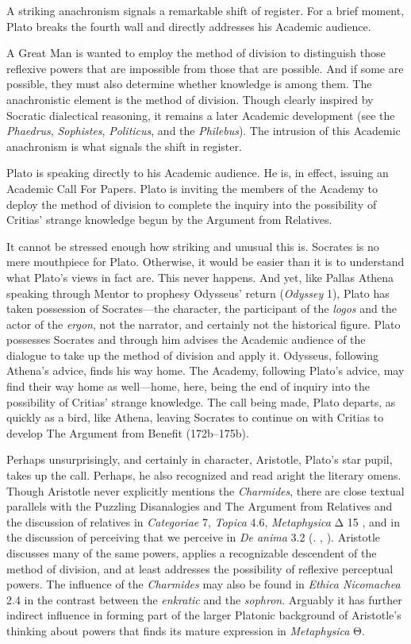 A striking anachronism signals a remarkable shift of register. For a brief moment, Plato breaks the fourth wall and directly addresses his Academic audience.

A Great Man is wanted to employ the method of division to distinguish those reflexive powers that are impossible from those that are possible. And if some are possible, they must also determine whether knowledge is among them. The anachronistic element is the method of division. Though clearly inspired by Socratic dialectical reasoning, it remains a later Academic development (see the \emph{Phaedrus}, \emph{Sophistes}, \emph{Politicus}, and the \emph{Philebus}). The intrusion of this Academic anachronism is what signals the shift in register.

Plato is speaking directly to his Academic audience. He is, in effect, issuing an Academic Call For Papers. Plato is inviting the members of the Academy to deploy the method of division to complete the inquiry into the possibility of Critias' strange knowledge begun by the Argument from Relatives. 

It cannot be stressed enough how striking and unusual this is. Socrates is no mere mouthpiece for Plato. Otherwise, it would be easier than it is to understand what Plato's views in fact are. This never happens. And yet, like Pallas Athena speaking through Mentor to prophesy Odysseus' return (\emph{Odyssey} 1), Plato has taken possession of Socrates—the character, the participant of the \emph{logos} and the actor of the \emph{ergon}, not the narrator, and certainly not the historical figure. Plato possesses Socrates and through him advises the Academic audience of the dialogue to take up the method of division and apply it. Odysseus, following Athena's advice, finds his way home. The Academy, following Plato's advice, may find their way home as well—home, here, being the end of inquiry into the possibility of Critias' strange knowledge. The call being made, Plato departs, as quickly as a bird, like Athena, leaving Socrates to continue on with Critias to develop The Argument from Benefit (172b–175b).

Perhaps unsurprisingly, and certainly in character, Aristotle, Plato's star pupil, takes up the call. Perhaps, he also recognized and read aright the literary omens. Though Aristotle never explicitly mentions the \emph{Charmides}, there are close textual parallels with the Puzzling Disanalogies and The Argument from Relatives and the discussion of relatives in \emph{Categoriae} 7, \emph{Topica} 4.6, \emph{Metaphysica} {\sbl Δ} 15 \citep{Duncombe:2020gi}, and in the discussion of perceiving that we perceive in \emph{De anima} 3.2 (\citealt{caston02}. \citealt{McCabe:2007jb}, \citealt{Kosman:2014ab}). Aristotle discusses many of the same powers, applies a recognizable descendent of the method of division, and at least addresses the possibility of reflexive perceptual powers. The influence of the \emph{Charmides} may also be found in \emph{Ethica Nicomachea} 2.4 in the contrast between the \emph{enkratic} and the \emph{sophron}. Arguably it has further indirect influence in forming part of the larger Platonic background of Aristotle's thinking about powers that finds its mature expression in \emph{Metaphysica} {\sbl Θ}.

